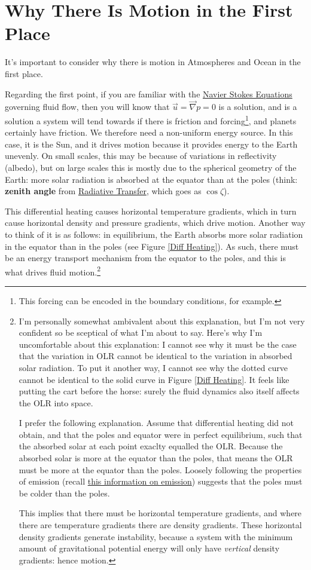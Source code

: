 \section{Why There Is Motion in the First Place}\label{Differential Heating}

It's important to consider why there is motion in Atmospheres and Ocean in the first place.

Regarding the first point, if you are familiar with the \hyperref[Navier Stokes]{Navier Stokes Equations} governing fluid flow, then you will know that $\vec{u}=\vec{\nabla}p=0$ is a solution, and is a solution a system will tend towards if there is friction and forcing\footnote{This forcing can be encoded in the boundary conditions, for example.}, and planets certainly have friction. We therefore need a non-uniform energy source. In this case, it is the Sun, and it drives motion because it provides energy to the Earth unevenly. On small scales, this may be because of variations in reflectivity (albedo), but on large scales this is mostly due to the spherical geometry of the Earth: more solar radiation is absorbed at the equator than at the poles (think: \textbf{zenith angle} from \hyperref[Radiative Transfer]{Radiative Transfer}, which goes as $\cos\zeta$).

This differential heating causes horizontal temperature gradients, which in turn cause horizontal density and pressure gradients, which drive motion. Another way to think of it is as follows: in equilibrium, the Earth absorbs more solar radiation in the equator than in the poles (see Figure \ref{Diff Heating}). As such, there must be an energy transport mechanism from the equator to the poles, and this is what drives fluid motion.\footnote{
    I'm personally somewhat ambivalent about this explanation, but I'm not very confident so be sceptical of what I'm about to say. Here's why I'm uncomfortable about this explanation: I cannot see why it must be the case that the variation in OLR cannot be identical to the variation in absorbed solar radiation. To put it another way, I cannot see why the dotted curve cannot be identical to the solid curve in Figure \ref{Diff Heating}. It feels like putting the cart before the horse: surely the fluid dynamics also itself affects the OLR into space.

    I prefer the following explanation. Assume that differential heating did not obtain, and that the poles and equator were in perfect equilibrium, such that the absorbed solar at each point exaclty equalled the OLR. Because the absorbed solar is more at the equator than the poles, that means the OLR must be more at the equator than the poles. Loosely following the properties of emission (recall  \hyperref[Emission Box]{this information on emission}) suggests that the poles must be colder than the poles. 

    This implies that there must be horizontal temperature gradients, and where there are temperature gradients there are density gradients. These horizontal density gradients generate instability, because a system with the minimum amount of gravitational potential energy will only have \textit{vertical} density gradients: hence motion.
}

